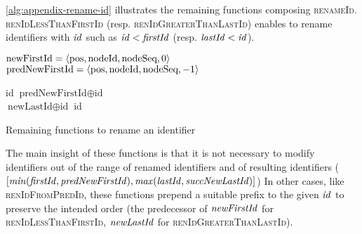 \label{app:rename-id}

\autoref{alg:appendix-rename-id} illustrates the remaining functions composing \textsc{renameId}.
\textsc{renIdLessThanFirstId} (resp. \textsc{renIdGreaterThanLastId}) enables to rename identifiers with $\mathit{id}$ such as $\mathit{id} < \mathit{firstId}$ (resp. $\mathit{lastId} < \mathit{id}$).

\begin{algorithm}[!ht]
  \footnotesize
  \begin{algorithmic}[1]
      \Statex \Comment $\text{newFirstId} = \langle \text{pos},\text{nodeId},\text{nodeSeq},0 \rangle$
      \Statex \Comment $\text{predNewFirstId} = \langle \text{pos},\text{nodeId},\text{nodeSeq},-1 \rangle$

          \State \Return $\text{id}$
      \Else
          \State \Return $\text{predNewFirstId} \oplus \text{id}$
        \EndIf
      \EndFunction
      \\
              \State \Return $\text{newLastId} \oplus \text{id}$
          \Else
              \State \Return $\text{id}$
          \EndIf
      \EndFunction
  \end{algorithmic}
  \caption{Remaining functions to rename an identifier}
  \label{alg:appendix-rename-id}
\end{algorithm}

The main insight of these functions is that it is not necessary to modify identifiers out of the range of renamed identifiers and of resulting identifiers ($[\mathit{min}(\mathit{firstId}, \mathit{predNewFirstId}), \mathit{max}(\mathit{lastId}, \mathit{succNewLastId})]$)
%
In other cases, like \textsc{renIdFromPredId}, these functions prepend a suitable prefix to the given $\mathit{id}$ to preserve the intended order (the predecessor of $\mathit{newFirstId}$ for \textsc{renIdLessThanFirstId}, $\mathit{newLastId}$ for \textsc{renIdGreaterThanLastId}).

